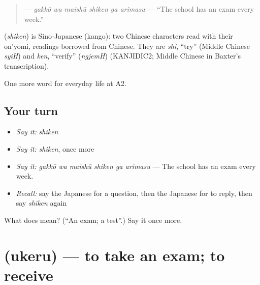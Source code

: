 \begin{quote}
\textbf{   } — \emph{gakkō wa maishū shiken ga arimasu} — \textquotedblleft{}The school has an exam every week.\textquotedblright{}
\end{quote}

\begin{cousinweb}
\textbf{} (\emph{shiken}) is Sino-Japanese (kango): two Chinese characters read with their on'yomi, readings borrowed from Chinese. They are \emph{shi}, \textquotedblleft{}try\textquotedblright{} (Middle Chinese \emph{syiH}) and \emph{ken}, \textquotedblleft{}verify\textquotedblright{} (\emph{ngjemH}) (KANJIDIC2; Middle Chinese in Baxter's transcription).
\end{cousinweb}

\begin{grammarlens}[title={What you've built}]
One more word for everyday life at A2.
\end{grammarlens}

\subsection*{Your turn}
\begin{itemize}
\raggedright
  \item \emph{Say it:} \emph{shiken}
  \item \emph{Say it:} \emph{shiken}, once more
  \item \emph{Say it:} \emph{gakkō wa maishū shiken ga arimasu} — The school has an exam every week.
  \item \emph{Recall:} say the Japanese for a question, then the Japanese for to reply, then say \emph{shiken} again
\end{itemize}

\begin{tcolorbox}[breakable,colback=teal!4,colframe=teal!35!black,title={Before you move on}]
What does  mean? (\textquotedblleft{}An exam; a test\textquotedblright{}.) Say it once more.
\end{tcolorbox}
\section[\texorpdfstring{\ja{うける} (ukeru)}{うける (ukeru)}]{ (ukeru) — to take an exam; to receive}

\label{lesson:JA-C226-ukeru}



